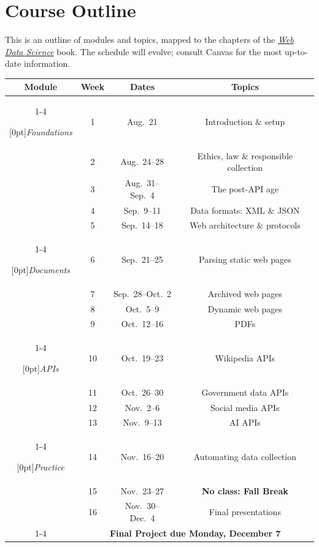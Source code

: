 \documentclass[11pt]{memoir}
\def\bookurl{https://cuinfoscience.github.io/Web-Data-Science-Book/}
\begin{document}
\clearpage
\section{Course Outline}

This is an outline of modules and topics, mapped to the chapters of the \href{\bookurl}{\textit{Web Data Science}} book. The schedule will evolve; consult Canvas for the most up-to-date information.

\begin{table}[ht]
\centering
    \begin{tabular}{cccc}
        \toprule[.15em]
        \textbf{Module} & \textbf{Week} & \textbf{Dates} & \textbf{Topics} \\
        \cmidrule[.1em](lr){1-4}

        \multirow{5}{*}[0pt]{\textit{Foundations}}
            & 1 & Aug.~21 & Introduction \& setup \\
            & 2 & Aug.~24--28 & Ethics, law \& responsible collection \\
            & 3 & Aug.~31--Sep.~4 & The post-API age \\
            & 4 & Sep.~9--11 & Data formats: XML \& JSON \\
            & 5 & Sep.~14--18 & Web architecture \& protocols \\ \cmidrule[.1em](lr){1-4}

        \multirow{4}{*}[0pt]{\textit{Documents}}
            & 6 & Sep.~21--25 & Parsing static web pages \\
            & 7 & Sep.~28--Oct.~2 & Archived web pages \\
            & 8 & Oct.~5--9 & Dynamic web pages \\
            & 9 & Oct.~12--16 & PDFs \\ \cmidrule[.1em](lr){1-4}

        \multirow{4}{*}[0pt]{\textit{APIs}}
            & 10 & Oct.~19--23 & Wikipedia APIs \\
            & 11 & Oct.~26--30 & Government data APIs \\
            & 12 & Nov.~2--6 & Social media APIs \\
            & 13 & Nov.~9--13 & AI APIs \\ \cmidrule[.1em](lr){1-4}

        \multirow{3}{*}[0pt]{\textit{Practice}}
            & 14 & Nov.~16--20 & Automating data collection \\
            & 15 & Nov.~23--27 & \textbf{No class: Fall Break} \\
            & 16 & Nov.~30--Dec.~4 & Final presentations \\
            \cmidrule[.1em](lr){1-4}
            & \multicolumn{3}{c}{\textbf{Final Project due Monday, December 7}} \\


\end{tabular}
\end{table}
\end{document}
